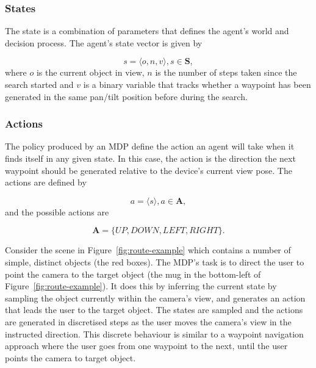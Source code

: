 \documentclass[a4paper, twoside]{article}
\begin{document}
\subsubsection{States}\label{sec:states}

\noindent The state is a combination of parameters that defines the agent's world and decision process. The agent's state vector is given by 

\begin{equation}
  s = \langle{}o, n, v\rangle, s\in{}\mathbf{S}, 
\end{equation}
where $o$ is the current object in view, $n$ is the number of steps taken since the search started and $v$ is a binary variable that tracks whether a waypoint has been generated in the same pan/tilt position before during the search. 

\subsubsection{Actions}

The policy produced by an MDP define the action an agent will take when it finds itself in any given state. In this case, the action is the direction the next waypoint should be generated relative to the device's current view pose. The actions are defined by

\begin{equation}
  a = \langle{}s\rangle, a\in{}\mathbf{A},
\end{equation}
and the possible actions are

\begin{equation}
  \mathbf{A} = \{UP, DOWN, LEFT, RIGHT\}.
\end{equation}

Consider the scene in Figure~\ref{fig:route-example} which contains a number of simple, distinct objects (the red boxes). The MDP's task is to direct the user to point the camera to the target object (the mug in the bottom-left of Figure~\ref{fig:route-example}). It does this by inferring the current state by sampling the object currently within the camera's view, and generates an action that leads the user to the target object. The states are sampled and the actions are generated in discretised steps as the user moves the camera's view in the instructed direction. This discrete behaviour is similar to a waypoint navigation approach where the user goes from one waypoint to the next, until the user points the camera to target object. 
\end{document}
